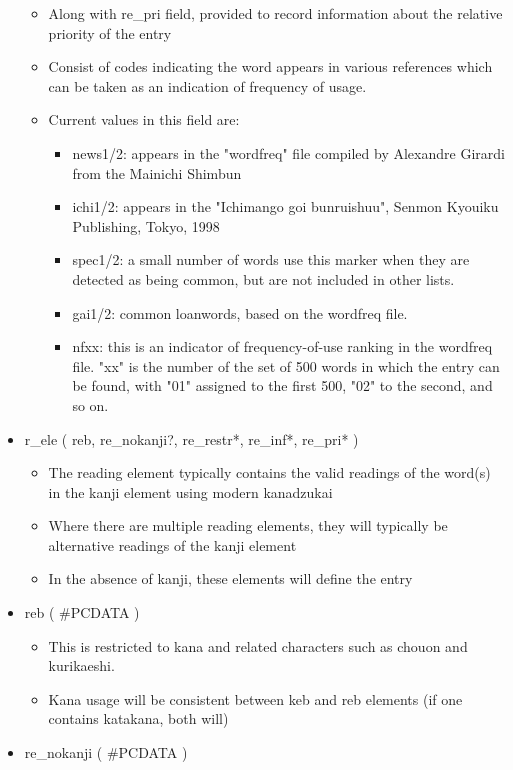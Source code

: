 \documentclass[11pt]{article}
\begin{document}
\begin{itemize}
\begin{itemize}
\item Along with re\_pri field, provided to record information about the relative priority of the entry
\item Consist of codes indicating the word appears in various references which can be taken as an indication of frequency of usage.
\item Current values in this field are:
\begin{itemize}
\item news1/2: appears in the "wordfreq" file compiled by Alexandre Girardi from the Mainichi Shimbun
\item ichi1/2: appears in the "Ichimango goi bunruishuu", Senmon Kyouiku Publishing, Tokyo, 1998
\item spec1/2: a small number of words use this marker when they are detected as being common, but are not included in other lists.
\item gai1/2: common loanwords, based on the wordfreq file.
\item nfxx: this is an indicator of frequency-of-use ranking in the wordfreq file. "xx" is the number of the set of 500 words in
which the entry can be found, with "01" assigned to the first 500, "02" to the second, and so on.
\end{itemize}
\end{itemize}
\item r\_ele ( reb, re\_nokanji?, re\_restr*, re\_inf*, re\_pri* )
\begin{itemize}
\item The reading element typically contains the valid readings of the word(s) in the kanji element using modern kanadzukai
\item Where there are multiple reading elements, they will typically be alternative readings of the kanji element
\item In the absence of kanji, these elements will define the entry
\end{itemize}
\item reb ( \#PCDATA )
\begin{itemize}
\item This is restricted to kana and related characters such as chouon and kurikaeshi.
\item Kana usage will be consistent between keb and reb elements (if one contains katakana, both will)
\end{itemize}
\item re\_nokanji ( \#PCDATA )
\begin{itemize}

\end{itemize}
\end{itemize}
\end{document}
